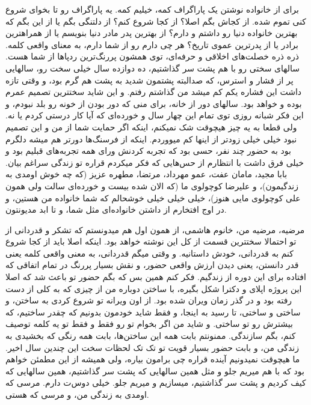 \begin{flushright}
\foreignlanguage{persian}
{
برای از خانواده نوشتن یک پاراگراف کمه، خیلیم کمه. یه پاراگراف رو تا بخوای شروع کنی تموم شده. از کجاش بگم اصلا؟ از کجا شروع کنم؟ از دلتنگی بگم یا از این بگم که بهترین خانواده دنیا رو داشتم و دارم؟ از بهترین پدر مادر دنیا بنویسم یا از همراهترین برادر یا از پدرترین عموی تاریخ؟ هر چی دارم رو از شما دارم، به معنای واقعی کلمه. ذره ذره خصلت‌های اخلاقی و حرفه‌ای، توی همشون پررنگ‌ترین ردپاها از شما هست. سالهای سختی رو با هم پشت سر گذاشتیم، ده دوازده سال خیلی سخت رو، سالهایی پر از فشار و استرس، که صدالبته پشتمون شدید به پشت هم گرم بود، و وقتی تازه داشت این فشاره یکم کم میشد من گذاشتم رفتم. و این شاید سختترین تصمیم عمرم بوده و خواهد بود. سالهای دور از خانه، برای منی که دور بودن از خونه رو بلد نبودم، و این فکر شبانه روزی توی تمام این چهار سال و خورده‌ای که آیا کار درستی کردم یا نه. ولی قطعا به یه چیز هیچوقت شک نمیکنم، اینکه اگر حمایت شما از من و این تصمیم نبود خیلی خیلی زودتر از اینها کم میووردم. اینکه از فرسنگ‌ها دورتر هم میشه دلگرم بود به حضور چند نفر، حسی بود که تجربه کردنش ورای همه تجربه‌های قبلیم بود و خیلی فرق داشت با انتظارم از حس‌هایی که فکر میکردم قراره تو زندگی سراغم بیان. بابا مجید، مامان عفت، عمو مهرداد، مرتضا، مطهره عزیز (که چه خوش اومدی به زندگیمون)، و علیرضا کوچولوی ما (که الان شده بیست و خورده‌ای سالت ولی همون علی کوچولوی مایی هنوز)، خیلی خیلی خیلی خوشحالم که شما خانواده من هستین، و در اوج افتخارم از داشتن خانواده‌ای مثل شما، و تا ابد مدیونتون.
}
\end{flushright}

\begin{flushright}
\foreignlanguage{persian}
{
مرضیه، مرضیه من، خانوم هاشمی، از همون اول هم میدونستم که تشکر و قدردانی از تو احتمالا سختترین قسمت از کل این نوشته خواهد بود. اینکه اصلا باید از کجا شروع کنم به قدردانی، خودش داستانیه. و وقتی میگم قدردانی، به معنی واقعی کلمه یعنی قدر دانستن، یعنی دیدن ارزش واقعی حضور، و نقش بسیار پررنگ در تمام اتفاقی که افتاده برای این دوره از زندگیم. فکر کنم همین بس که بگم حضور تو باعث شد که اصلا این پروژه اپلای و دکترا شکل بگیره، با ساختن دوباره من از چیزی که به کلی از دست رفته بود و در گذر زمان ویران شده بود. از اون ویرانه تو شروع کردی به ساختن، و ساختی و ساختی، تا رسید به اینجا، و فقط شاید خودمون بدونیم که چقدر ساختیم، که بیشترش رو تو ساختی. و شاید من اگر بخوام تو رو فقط و فقط تو یه کلمه توصیف کنم، بگم سازندگی. ممنونتم بابت همه این ساختن‌ها، بابت همه رنگی که بخشیدی به زندگی من، و بابت حضور بسیار قویت تو تک تک لحظات سخت این چندین سال اخیر. ما هیچوقت نمیدونیم آینده قراره چی برامون بیاره، ولی همیشه از این مطمئن خواهم بود که با هم میریم جلو و مثل همین سالهایی که پشت سر گذاشتیم، همین سالهایی که کیف کردیم و پشت سر گذاشتیم، میسازیم و میریم جلو. خیلی دوس‌ت دارم. مرسی که اومدی به زندگی من، و مرسی که هستی.
}
\end{flushright}

